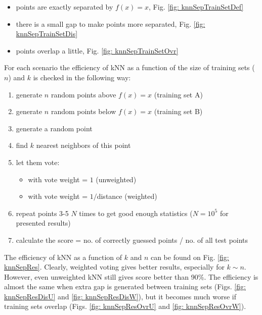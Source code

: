 \begin{itemize}
 \item points are exactly separated by $f(x) = x$, Fig. \ref{fig: knnSepTrainSetDef}
 \item there is a small gap to make points more separated, Fig. \ref{fig: knnSepTrainSetDis}
 \item points overlap a little, Fig. \ref{fig: knnSepTrainSetOvr}
\end{itemize}

For each scenario the efficiency of kNN as a function of the size of training sets ($n$) and $k$ is checked in the following way:

\begin{enumerate}
 \item generate $n$ random points above $f(x) = x$ (training set A)
 \item generate $n$ random points below $f(x) = x$ (training set B)
 \item generate a random point
 \item find $k$ nearest neighbors of this point
 \item let them vote:
 \begin{itemize}
  \item with vote weight = $1$ (unweighted)
  \item with vote weight = $1/$distance (weighted)
 \end{itemize}
 \item repeat points 3-5 $N$ times to get good enough statistics ($N = 10^5$ for presented results)
 \item calculate the score = no. of correctly guessed points / no. of all test points
\end{enumerate}

The efficiency of kNN as a function of $k$ and $n$ can be found on Fig. \ref{fig: knnSepRes}. Clearly, weighted voting gives better results, especially for $k \sim n$. However, even unweighted kNN still gives score better than 90\%. The efficiency is almost the same when extra gap is generated between training sets (Figs. \ref{fig: knnSepResDisU} and \ref{fig: knnSepResDisW}), but it becomes much worse if training sets overlap (Figs. \ref{fig: knnSepResOvrU} and \ref{fig: knnSepResOvrW}).


